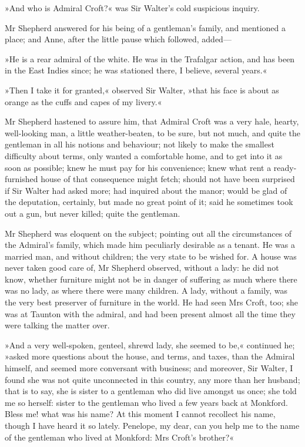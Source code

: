 »And who is Admiral Croft?« was Sir Walter's cold suspicious inquiry.

Mr Shepherd answered for his being of a gentleman's family, and mentioned a place; and Anne, after the little pause which followed, added—

»He is a rear admiral of the white. He was in the Trafalgar action, and has been in the East Indies since; he was stationed there, I believe, several years.«

»Then I take it for granted,« observed Sir Walter, »that his face is about as orange as the cuffs and capes of my livery.«

Mr Shepherd hastened to assure him, that Admiral Croft was a very hale, hearty, well-looking man, a little weather-beaten, to be sure, but not much, and quite the gentleman in all his notions and behaviour; not likely to make the smallest difficulty about terms, only wanted a comfortable home, and to get into it as soon as possible; knew he must pay for his convenience; knew what rent a ready-furnished house of that consequence might fetch; should not have been surprised if Sir Walter had asked more; had inquired about the manor; would be glad of the deputation, certainly, but made no great point of it; said he sometimes took out a gun, but never killed; quite the gentleman.

Mr Shepherd was eloquent on the subject; pointing out all the circumstances of the Admiral's family, which made him peculiarly desirable as a tenant. He was a married man, and without children; the very state to be wished for. A house was never taken good care of, Mr Shepherd observed, without a lady: he did not know, whether furniture might not be in danger of suffering as much where there was no lady, as where there were many children. A lady, without a family, was the very best preserver of furniture in the world. He had seen Mrs Croft, too; she was at Taunton with the admiral, and had been present almost all the time they were talking the matter over.

»And a very well-spoken, genteel, shrewd lady, she seemed to be,« continued he; »asked more questions about the house, and terms, and taxes, than the Admiral himself, and seemed more conversant with business; and moreover, Sir Walter, I found she was not quite unconnected in this country, any more than her husband; that is to say, she is sister to a gentleman who did live amongst us once; she told me so herself: sister to the gentleman who lived a few years back at Monkford. Bless me! what was his name? At this moment I cannot recollect his name, though I have heard it so lately. Penelope, my dear, can you help me to the name of the gentleman who lived at Monkford: Mrs Croft's brother?«

